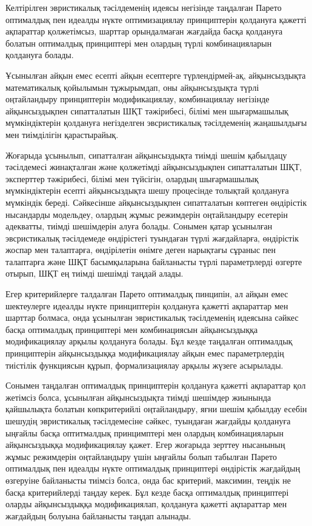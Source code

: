 \begin{multicols}{2}
Келтірілген эвристикалық тәсілдеменің идеясы негізінде таңдалған Парето
оптималдық пен идеалды нүкте оптимизациялау принциптерін қолдануға
қажетті ақпараттар қолжетімсыз, шарттар орындалмаған жағдайда басқа
қолдануға болатын оптималдық принциптері мен олардың түрлі
комбинацияларын қолдануға болады.

Ұсынылған айқын емес есепті айқын есептерге түрлендірмей-ақ,
айқынсыздықта математикалық қойылымын тұжырымдап, оны айқынсыздықта
түрлі оңтайландыру принциптерін модификациялау, комбинациялау негізінде
айқынсыздықпен сипатталатын ШҚТ тәжірибесі, білімі мен шығармашылық
мүмкіндіктерін қолдануға негізделген эвсристикалық тәсілдеменің
жаңашылдығы мен тиімділігін қарастырайық.

Жоғарыда ұсынылып, сипатталған айқынсыздықта тиімді шешім қабылдацу
тәсілдемесі жинақталған және қолжетімді айқынсыздықпен сипатталатын ШҚТ,
эксперттер тәжірибесі, білімі мен түйсігін, олардың шығармашылық
мүмкіндіктерін есепті айқынсыздықта шешу процесінде толықтай қолдануға
мүмкіндік береді. Сәйкесінше айқынсыздықпен сипатталатын көптеген
өндірістік нысандарды модельдеу, олардың жұмыс режимдерін оңтайландыру
есетерін адекватты, тиімді шешімдерін алуға болады. Сонымен қатар
ұсынылған эвсристикалық тәсілдемеде өндірістегі туындаған түрлі
жағдайларға, өндірістік жоспар мен талаптарға, өндірілетін өнімге деген
нарықтағы сұраныс пен талаптарға және ШҚТ басымқыларына байланысты түрлі
параметрлерді өзгерте отырып, ШҚТ ең тиімді шешімді таңдай алады.

Егер критерийлерге талдалған Парето оптималдық пинципін, ал айқын емес
шектеулерге идеалды нүкте принциптерін қолдануға қажетті ақпараттар мен
шарттар болмаса, онда ұсынылған эвристикалық тәсілдеменің идеясына
сәйкес басқа оптималдық принциптері мен комбинациясын айқынсыздыққа
модификациялау арқылы қолдануға болады. Бұл кезде таңдалған оптималдық
принциптерін айқынсыздыққа модификациялау айқын емес параметрлердің
тиістілік функциясын құрып, формализациялау арқылы жүзеге асырылады.

Сонымен таңдалған оптималдық принциптерін қолдануға қажетті ақпараттар
қол жетімсіз болса, ұсынылған айқынсыздықта тиімді шешімдер жиынында
қайшылықта болатын көпкритерийлі оңтайландыру, яғни шешім қабылдау
есебін шешудің эвристикалық тәсілдемесіне сәйкес, туындаған жағдайды
қолдануға ыңғайлы басқа оптитмалдық принцимптері мен олардың
комбинацияларын айқынсыздыққа модификациялау қажет. Егер жоғарыда
зерттеу нысанының жұмыс режимдерін оңтайландыру үшін ыңғайлы болып
табылған Парето оптималдық пен идеалды нүкте оптималдық принциптері
өндірістік жағдайдың өзгеруіне байланысты тиімсіз болса, онда бас
критерий, максимин, теңдік не басқа критерийлерді таңдау керек. Бұл
кезде басқа оптималдық принциптері оларды айқынсыздыққа модификациялап,
қолдануға қажетті ақпараттар мен жағдайдың болуына байланысты таңдап
алынады.


\end{multicols}
